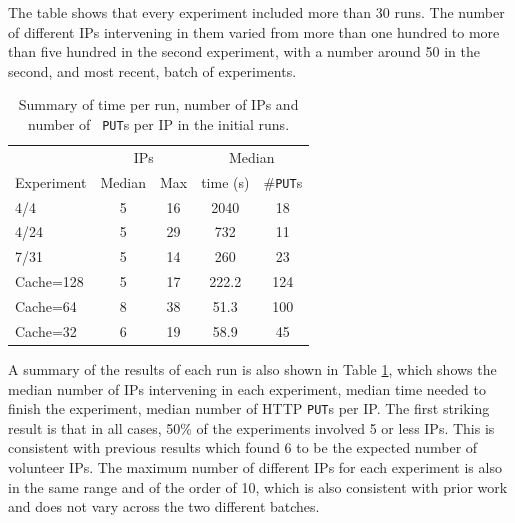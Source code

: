 \documentclass[letterpaper]{article}
\begin{document}
The table shows that every experiment included more than 30 runs. The
number of different IPs intervening in them varied from more than one
hundred to more than five hundred in the second experiment, with a
number around 50 in the second, and most recent, batch of experiments. 
%
\begin{table}[htb]
\caption{Summary of time per run, number of IPs and number of {\tt
    PUT}s per IP in the initial runs. \label{tab:summary:os}}
\begin{center}
\begin{tabular}{l|cccc}
\hline
     & \multicolumn{2}{c}{IPs} & \multicolumn{2}{c}{Median} \\
Experiment & Median & Max & time (s) &  \#{\tt  PUT}s \\
\hline
4/4 & 5 & 16 & 2040 & 18   \\
4/24 &  5 & 29 & 732 & 11  \\
7/31 & 5 & 14 & 260 & 23   \\
\hline
Cache=128 & 5 & 17 & 222.2 & 124 \\ 
Cache=64 & 8 & 38 & 51.3 & 100 \\
Cache=32 & 6 & 19 & 58.9 & 45 \\
\hline
\end{tabular}
\end{center}
\end{table}
%

A summary of the results of each run is also shown in Table
\ref{tab:summary:os}, which shows the median number of IPs
intervening in each experiment,  median time needed
to finish the experiment, median number of HTTP {\tt PUT}s per IP. The
first striking result is that in all cases, 50\% of the 
experiments involved 5 or less IPs. This is consistent with previous results
\citep{DBLP:conf/gecco/GuervosG15} which found 6 to be
the expected number of volunteer IPs. The
maximum number of different IPs for each experiment is also in the
same range and of the order of 10, which is also consistent with
prior work and does not vary across the two different batches. 
\end{document}
